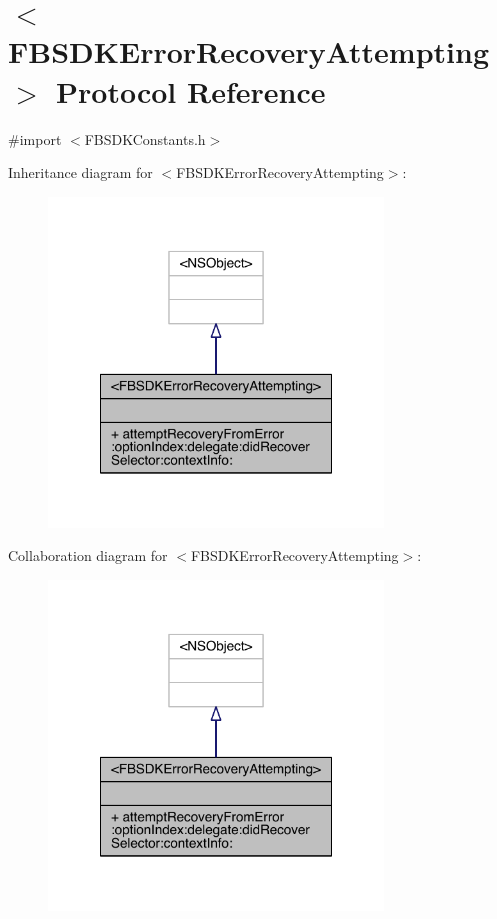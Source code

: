 \hypertarget{protocol_f_b_s_d_k_error_recovery_attempting-p}{\section{$<$F\-B\-S\-D\-K\-Error\-Recovery\-Attempting$>$ Protocol Reference}
\label{protocol_f_b_s_d_k_error_recovery_attempting-p}
}


{\ttfamily \#import $<$F\-B\-S\-D\-K\-Constants.\-h$>$}



Inheritance diagram for $<$F\-B\-S\-D\-K\-Error\-Recovery\-Attempting$>$\-:
\nopagebreak
\begin{figure}[H]
\begin{center}
\leavevmode
\includegraphics[width=252pt]{protocol_f_b_s_d_k_error_recovery_attempting-p__inherit__graph}
\end{center}
\end{figure}


Collaboration diagram for $<$F\-B\-S\-D\-K\-Error\-Recovery\-Attempting$>$\-:
\nopagebreak
\begin{figure}[H]
\begin{center}
\leavevmode
\includegraphics[width=252pt]{protocol_f_b_s_d_k_error_recovery_attempting-p__coll__graph}
\end{center}
\end{figure}
